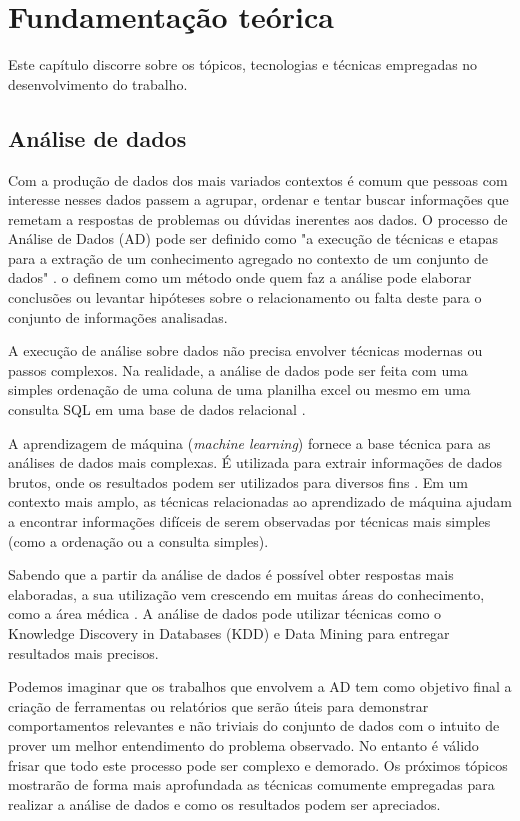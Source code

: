 \chapter{Fundamentação teórica}

Este capítulo discorre sobre os tópicos, tecnologias e técnicas empregadas no desenvolvimento do trabalho.

\section{Análise de dados}

Com a produção de dados dos mais variados contextos é comum que pessoas com interesse nesses dados passem a agrupar, ordenar e tentar buscar informações que remetam a respostas de problemas ou dúvidas inerentes aos dados. O processo de Análise de Dados (AD) pode ser definido como "a execução de técnicas e etapas para a extração de um conhecimento agregado no contexto de um conjunto de dados" \cite{AMARAL2016}.  o definem como um método onde quem faz a análise pode elaborar conclusões ou levantar hipóteses sobre o relacionamento ou falta deste para o conjunto de informações analisadas.

A execução de análise sobre dados não precisa envolver técnicas modernas ou passos complexos. Na realidade, a análise de dados pode ser feita com uma simples ordenação de uma coluna de uma planilha excel ou mesmo em uma consulta SQL em uma base de dados relacional \cite{AMARAL2016}. 

A aprendizagem de máquina (\emph{machine learning}) fornece a base técnica para as análises de dados mais complexas. É utilizada para extrair informações de dados brutos, onde os resultados podem ser utilizados para diversos fins \cite{Witten2016}. Em um contexto mais amplo, as técnicas relacionadas ao aprendizado de máquina ajudam a encontrar informações difíceis de serem observadas por técnicas mais simples (como a ordenação ou a consulta simples).

Sabendo que a partir da análise de dados é possível obter respostas mais elaboradas, a sua utilização vem crescendo em muitas áreas do conhecimento, como a área médica \cite{Holzinger2014}. A análise de dados pode utilizar técnicas como o Knowledge Discovery in Databases (KDD) \cite{Holzinger2014} e Data Mining \cite{Aggarwal2015} para entregar resultados mais precisos.

Podemos imaginar que os trabalhos que envolvem a AD tem como objetivo final a criação de ferramentas ou relatórios que serão úteis para demonstrar comportamentos relevantes e não triviais do conjunto de dados com o intuito de prover um melhor entendimento do problema observado. No entanto é válido frisar que todo este processo pode ser complexo e demorado. Os próximos tópicos mostrarão de forma mais aprofundada as técnicas comumente empregadas para realizar a análise de dados e como os resultados podem ser apreciados.

